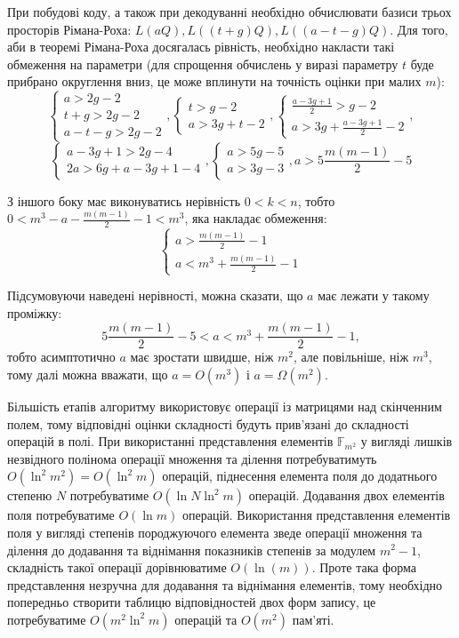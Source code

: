 \documentclass[a4paper,12pt,oneside]{article}
\begin{document}
При побудові коду, а також при декодуванні необхідно обчислювати базиси трьох просторів Рімана-Роха: $L(aQ), L( (t+g)Q ), L( (a-t-g)Q)$. 
Для того, аби в теоремі Рімана-Роха досягалась рівність, необхідно накласти такі обмеження на параметри (для спрощення обчислень у виразі параметру $t$ 
буде прибрано округлення вниз, це може вплинути на точність оцінки при малих $m$):
$$
\begin{cases}
    a > 2g - 2 \\
    t+g > 2g - 2 \\
    a - t -g > 2g -2
\end{cases},
\begin{cases}
    t > g - 2 \\
    a > 3g + t - 2
\end{cases},
\begin{cases}
    \frac{a-3g+1}{2} > g - 2 \\
    a > 3g + \frac{a-3g+1}{2} - 2
\end{cases},
$$
$$
\begin{cases}
    a-3g+1 > 2g - 4 \\
    2a > 6g + a-3g+1 - 4
\end{cases},
\begin{cases}
    a > 5g - 5 \\
    a > 3g - 3
\end{cases},
a > 5 \frac{m(m-1)}{2} - 5
$$

З іншого боку має виконуватись нерівність $0 < k < n$, тобто $0 < m^3 - a - \frac{m(m-1)}{2} - 1 < m^3$, яка накладає обмеження:
$$
\begin{cases}
    a > \frac{m(m-1)}{2} - 1 \\
    a < m^3 + \frac{m(m-1)}{2} - 1
\end{cases}
$$

Підсумовуючи наведені нерівності, можна сказати, що $a$ має лежати у такому проміжку:
$$5 \frac{m(m-1)}{2} - 5 < a < m^3 + \frac{m(m-1)}{2} - 1,$$
тобто асимптотично $a$ має зростати швидше, ніж $m^2$, але повільніше, ніж $m^3$, тому далі можна вважати, що $a=O(m^3)$ і $a=\Omega(m^2)$.

Більшість етапів алгоритму використовує операції із матрицями над скінченним полем, тому відповідні оцінки складності будуть прив'язані 
до складності операцій в полі. При використанні представлення елементів $\mathbb{F}_{m^2}$ у вигляді лишків незвідного полінома операції 
множення та ділення потребуватимуть $O(\ln^2 m^2)=O(\ln^2 m)$ операцій, піднесення елемента поля до додатнього степеню $N$ потребуватиме 
$O(\ln N \ln^2 m)$ операцій. Додавання двох елементів поля потребуватиме $O(\ln m)$ операцій. Використання представлення елементів поля у 
вигляді степенів породжуючого елемента зведе операції множення та ділення до додавання та віднімання показників степенів за модулем $m^2-1$, 
складність такої операції дорівнюватиме $O(\ln(m))$. Проте така форма представлення незручна для додавання та віднімання елементів, тому 
необхідно попередньо створити таблицю відповідностей двох форм запису, це потребуватиме $O(m^2 \ln^2 m)$ операцій та $O(m^2)$ пам'яті.
\end{document}
